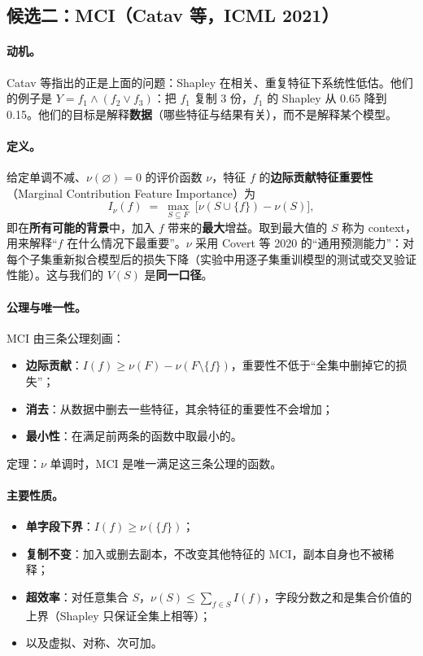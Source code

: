 \documentclass[zihao=-4,a4paper]{ctexart}
\begin{document}
\subsection{候选二：MCI（Catav 等，ICML 2021）}

\paragraph{动机。}Catav 等\cite{catav2021}指出的正是上面的问题：Shapley 在相关、重复特征下系统性低估。他们的例子是 $Y=f_1\wedge(f_2\vee f_3)$：把 $f_1$ 复制 3 份，$f_1$ 的 Shapley 从 0.65 降到 0.15。他们的目标是解释\textbf{数据}（哪些特征与结果有关），而不是解释某个模型。

\paragraph{定义。}给定单调不减、$\nu(\varnothing)=0$ 的评价函数 $\nu$，特征 $f$ 的\textbf{边际贡献特征重要性}（Marginal Contribution Feature Importance）为
\[
  I_\nu(f) \;=\; \max_{S\subseteq F}\;\big[\nu(S\cup\{f\})-\nu(S)\big],
\]
即在\textbf{所有可能的背景}中，加入 $f$ 带来的\textbf{最大}增益。取到最大值的 $S$ 称为 context，用来解释“$f$ 在什么情况下最重要”。$\nu$ 采用 Covert 等 2020 的“通用预测能力”：对每个子集重新拟合模型后的损失下降（实验中用逐子集重训模型的测试或交叉验证性能）。这与我们的 $V(S)$ 是\textbf{同一口径}。

\paragraph{公理与唯一性。}MCI 由三条公理刻画：
\begin{itemize}[leftmargin=*]
  \item \textbf{边际贡献}：$I(f)\ge \nu(F)-\nu(F\setminus\{f\})$，重要性不低于“全集中删掉它的损失”；
  \item \textbf{消去}：从数据中删去一些特征，其余特征的重要性不会增加；
  \item \textbf{最小性}：在满足前两条的函数中取最小的。
\end{itemize}
定理：$\nu$ 单调时，MCI 是唯一满足这三条公理的函数。

\paragraph{主要性质。}
\begin{itemize}[leftmargin=*]
  \item \textbf{单字段下界}：$I(f)\ge\nu(\{f\})$；
  \item \textbf{复制不变}：加入或删去副本，不改变其他特征的 MCI，副本自身也不被稀释；
  \item \textbf{超效率}：对任意集合 $S$，$\nu(S)\le\sum_{f\in S}I(f)$，字段分数之和是集合价值的上界（Shapley 只保证全集上相等）；
  \item 以及虚拟、对称、次可加。
\end{itemize}
\end{document}
